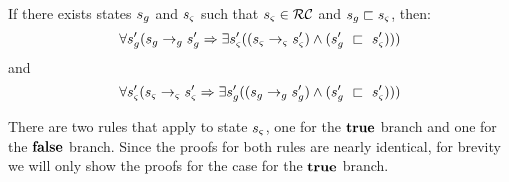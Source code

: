 \begin{lemma}
\label{lem:compare}
If there exists states $s_{g}$ and $s_{\varsigma}$ such that $s_{\varsigma} \in \mathcal{RC}$ and $s_{g} \sqsubset s_{\varsigma}$, then:
\begin{equation}
\forall s_{g}^\prime ( s_{g} \rightarrow_{g} s_{g}^\prime \Rightarrow \exists s_{\varsigma}^\prime( (s_{\varsigma} \rightarrow_{\varsigma} s_{\varsigma}^\prime )\wedge (s_{g}^\prime\ \sqsubset\ s_{\varsigma}^\prime ))  )
\end{equation}
and
\begin{equation}
\forall s_{\varsigma}^\prime ( s_{\varsigma} \rightarrow_{\varsigma} s_{\varsigma}^\prime\Rightarrow \exists s_{g}^\prime( (s_{g} \rightarrow_{g} s_{g}^\prime )\wedge (s_{g}^\prime\ \sqsubset\ s_{\varsigma}^\prime ))  )
\end{equation}
\end{lemma}
There are two rules that apply to state $s_{\varsigma}$, one for the $\textbf{true}$ branch and one for the $\textbf{false}$ branch. Since the proofs for both rules are nearly identical, for brevity we will only show the proofs for the case for the $\textbf{true}$ branch. 
